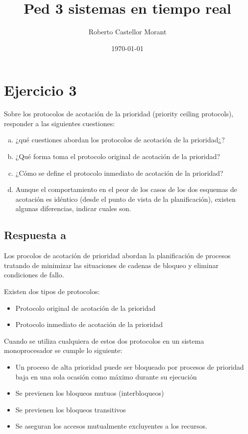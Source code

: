 \documentclass[a4paper,10pt]{article}
\author{Roberto Castellor Morant}
\title{Ped 3 sistemas en tiempo real}
\date{\today}
\begin{document}
\maketitle


\section{Ejercicio 3}

Sobre los protocolos de acotación de la prioridad (priority ceiling protocols),
responder a las siguientes cuestiones:
\begin{enumerate}[a)]
	\item ¿qué cuestiones abordan los protocolos de acotación de la
		prioridad¿?
	\item ¿Qué forma toma el protocolo original de acotación de la prioridad?
	\item ¿Cómo se define el protocolo inmediato de acotación de la prioridad?
	\item Aunque el comportamiento en el peor de los casos de los dos 
		esquemas de acotación es idéntico (desde el punto de vista de la 
		planificación), existen algunas diferencias, indicar cuales son.

\end{enumerate}

\subsection{Respuesta a}

Los procolos de acotación de prioridad abordan la planificación de procesos
tratando de minimizar las situaciones de cadenas de bloqueo y eliminar
condiciones de fallo.

Existen dos tipos de protocolos:

\begin{itemize}
	\item Protocolo original de acotación de la prioridad
	\item Protocolo inmediato de acotación de la prioridad
\end{itemize}

Cuando se utiliza cualquiera de estos dos protocolos en un sistema
monoprocesador se cumple lo siguiente:

\begin{itemize}
	\item Un proceso de alta prioridad puede ser bloqueado por procesos de
		prioridad baja en una sola ocasión como máximo durante su
		ejecución
	\item Se previenen los bloqueos mutuos (interbloqueos)
	\item Se previenen los bloqueos transitivos
	\item Se aseguran los accesos mutualmente excluyentes a los recursos.
\end{itemize}
\end{document}
